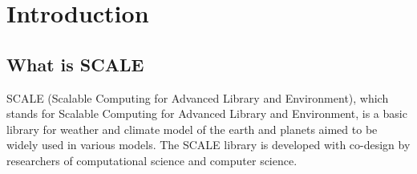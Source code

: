 \chapter{Introduction}


\section{What is SCALE}
SCALE (Scalable Computing for Advanced Library and Environment), which stands for Scalable Computing for Advanced Library and Environment, is a basic library for weather and climate model of the earth and planets aimed to be widely used in various models.
The SCALE library is developed with co-design by researchers of computational science and computer science.

